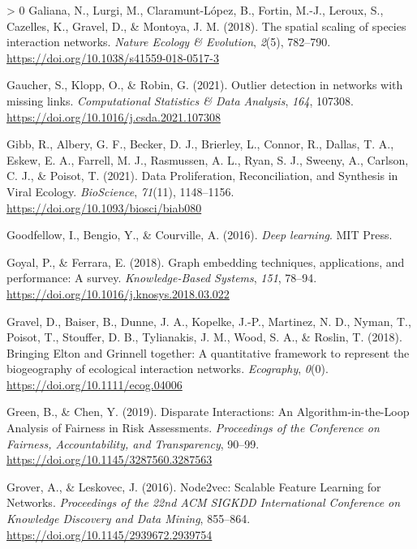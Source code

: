 \documentclass[11pt]{article}
\newlength{\cslhangindent}
\newenvironment{CSLReferences}[3] %
 {%
  \setlength{\parindent}{0pt}
  \ifodd #1 \everypar{\setlength{\hangindent}{\cslhangindent}}\ignorespaces\fi
  \ifnum #2 > 0
  \setlength{\parskip}{#2\baselineskip}
  \fi
 }%
 {}
\begin{document}
\begin{CSLReferences}{1}{0}
\leavevmode\hypertarget{ref-Galiana2018SpaSca}{}%
Galiana, N., Lurgi, M., Claramunt-López, B., Fortin, M.-J., Leroux, S.,
Cazelles, K., Gravel, D., \& Montoya, J. M. (2018). The spatial scaling
of species interaction networks. \emph{Nature Ecology \& Evolution},
\emph{2}(5), 782--790. \url{https://doi.org/10.1038/s41559-018-0517-3}

\leavevmode\hypertarget{ref-Gaucher2021OutDet}{}%
Gaucher, S., Klopp, O., \& Robin, G. (2021). Outlier detection in
networks with missing links. \emph{Computational Statistics \& Data
Analysis}, \emph{164}, 107308.
\url{https://doi.org/10.1016/j.csda.2021.107308}

\leavevmode\hypertarget{ref-Gibb2021DatPro}{}%
Gibb, R., Albery, G. F., Becker, D. J., Brierley, L., Connor, R.,
Dallas, T. A., Eskew, E. A., Farrell, M. J., Rasmussen, A. L., Ryan, S.
J., Sweeny, A., Carlson, C. J., \& Poisot, T. (2021). Data
Proliferation, Reconciliation, and Synthesis in Viral Ecology.
\emph{BioScience}, \emph{71}(11), 1148--1156.
\url{https://doi.org/10.1093/biosci/biab080}

\leavevmode\hypertarget{ref-Goodfellow2016DeeLea}{}%
Goodfellow, I., Bengio, Y., \& Courville, A. (2016). \emph{Deep
learning}. MIT Press.

\leavevmode\hypertarget{ref-Goyal2018GraEmb}{}%
Goyal, P., \& Ferrara, E. (2018). Graph embedding techniques,
applications, and performance: A survey. \emph{Knowledge-Based Systems},
\emph{151}, 78--94. \url{https://doi.org/10.1016/j.knosys.2018.03.022}

\leavevmode\hypertarget{ref-Gravel2018BriElt}{}%
Gravel, D., Baiser, B., Dunne, J. A., Kopelke, J.-P., Martinez, N. D.,
Nyman, T., Poisot, T., Stouffer, D. B., Tylianakis, J. M., Wood, S. A.,
\& Roslin, T. (2018). Bringing Elton and Grinnell together: A
quantitative framework to represent the biogeography of ecological
interaction networks. \emph{Ecography}, \emph{0}(0).
\url{https://doi.org/10.1111/ecog.04006}

\leavevmode\hypertarget{ref-Green2019DisInt}{}%
Green, B., \& Chen, Y. (2019). Disparate Interactions: An
Algorithm-in-the-Loop Analysis of Fairness in Risk Assessments.
\emph{Proceedings of the Conference on Fairness, Accountability, and
Transparency}, 90--99. \url{https://doi.org/10.1145/3287560.3287563}

\leavevmode\hypertarget{ref-Grover2016NodSca}{}%
Grover, A., \& Leskovec, J. (2016). Node2vec: Scalable Feature Learning
for Networks. \emph{Proceedings of the 22nd ACM SIGKDD International
Conference on Knowledge Discovery and Data Mining}, 855--864.
\url{https://doi.org/10.1145/2939672.2939754}


\end{CSLReferences}
\end{document}
